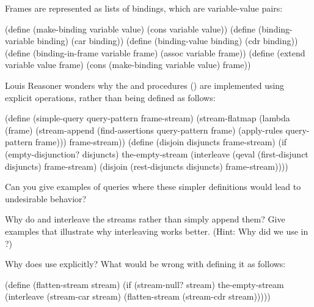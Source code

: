Frames are represented as lists of bindings, which are variable-value pairs:

\begin{codeBlock}
(define (make-binding variable value)
  (cons variable value))
(define (binding-variable binding) (car binding))
(define (binding-value binding) (cdr binding))
(define (binding-in-frame variable frame)
  (assoc variable frame))
(define (extend variable value frame)
  (cons (make-binding variable value) frame))
\end{codeBlock}

\begin{exerciseGroup}
\label{Exercise 4.71}
 Louis Reasoner wonders why the
 and  procedures () are
implemented using explicit  operations, rather than being defined
as follows:

\begin{codeBlock}
(define (simple-query query-pattern frame-stream)
  (stream-flatmap
   (lambda (frame)
     (stream-append
      (find-assertions query-pattern frame)
      (apply-rules query-pattern frame)))
   frame-stream))
(define (disjoin disjuncts frame-stream)
  (if (empty-disjunction? disjuncts)
      the-empty-stream
      (interleave
       (qeval (first-disjunct disjuncts)
              frame-stream)
       (disjoin (rest-disjuncts disjuncts)
                frame-stream))))
\end{codeBlock}

Can you give examples of queries where these simpler definitions would lead to
undesirable behavior?

\label{Exercise 4.72}
 Why do  and
 interleave the streams rather than simply append them?
Give examples that illustrate why interleaving works better.  (Hint: Why did we
use  in ?)

\label{Exercise 4.73}
 Why does 
use  explicitly?  What would be wrong with defining it as follows:

\begin{codeBlock}
(define (flatten-stream stream)
  (if (stream-null? stream)
      the-empty-stream
      (interleave
       (stream-car stream)
       (flatten-stream (stream-cdr stream)))))
\end{codeBlock}


\end{exerciseGroup}
